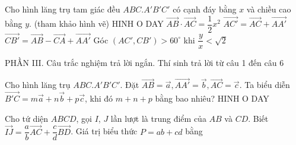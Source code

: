 \begin{ex}
	Cho hình lăng trụ tam giác đều $ABC.A'B'C'$ có cạnh đáy bằng $x$ và chiều cao bằng $y$. (tham khảo hình vẽ)
	{\centering\color{red} HINH O DAY}
	\choiceTF
	{\True $\vec{AB} \cdot \vec{AC}=\dfrac{1}{2}x^2$}
	{\True $\vec{AC'}=\vec{AC}+\vec{AA'}$}
	{$\vec{CB'}=\vec{AB}-\vec{CA}+\vec{AA'}$}
	{Góc $\left(AC',CB'\right)>60^\circ $ khi $\dfrac{y}{x}<\sqrt{2}$}
\end{ex}
PHẦN III. Câu trắc nghiệm trả lời ngắn. Thí sinh trả lời từ câu 1 đến câu 6
\begin{ex}
	Cho hình lăng trụ $ABC.A'B'C'$. Đặt $\vec{AB}=\vec{a},\vec{AA'}=\vec{b},\vec{AC}=\vec{c}$. Ta biểu diễn $\vec{B'C}=m\vec{a}+n\vec{b}+p\vec{c}$, khi đó $m+n+p$ bằng bao nhiêu?
	{\centering\color{red} HINH O DAY}
\end{ex}
\begin{ex}
	Cho tứ diện $ABCD$, gọi $I$, $J$ lần lượt là trung điểm của $AB$ và $CD$. Biết $\vec{IJ}=\dfrac{a}{b}\vec{AC}+\dfrac{c}{d}\vec{BD}$. Giá trị biểu thức $P=ab+cd$ bằng
\end{ex}
